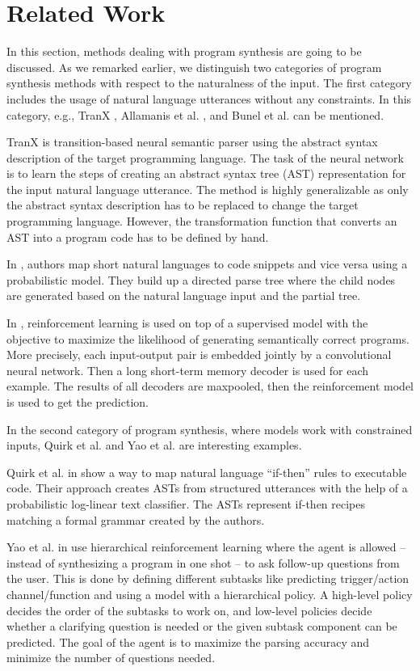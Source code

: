 \section{Related Work}

In this section, methods dealing with program synthesis are going to be
discussed. As we remarked earlier, we distinguish two categories of program
synthesis methods with respect to the naturalness of the input. The first
category includes the usage of natural language utterances without any constraints. In
this category, e.g., TranX \cite{tranx}, Allamanis et al. \cite{project3}, and
Bunel et al. \cite{project4} can be mentioned.

TranX is transition-based neural semantic parser using the abstract syntax
description of the target programming language. The task of the neural network
is to learn the steps of creating an abstract syntax tree (AST) representation
for the input natural language utterance. The method is highly generalizable as
only the abstract syntax description has to be replaced to change the target
programming language. However, the transformation function that converts an AST
into a program code has to be defined by hand.

In \cite{project3}, authors map short natural languages to code snippets and
vice versa using a probabilistic model. They build up a directed parse tree
where the child nodes are generated based on the natural language input and the
partial tree.

In \cite{project4}, reinforcement learning is used on top of a supervised model
with the objective to maximize the likelihood of generating semantically correct
programs. More precisely, each input-output pair is embedded jointly by a
convolutional neural network. Then a long short-term memory decoder is used for
each example. The results of all decoders are maxpooled, then the reinforcement
model is used to get the prediction.

In the second category of program synthesis, where models work with constrained
inputs, Quirk et al. \cite{project1} and Yao et al. \cite{project11} are
interesting examples.

Quirk et al. in \cite{project1} show a way to map natural language “if-then” rules
to executable code. Their approach creates ASTs from structured utterances
with the help of a probabilistic log-linear text classifier. The ASTs represent
if-then recipes matching a formal grammar created by the authors.

Yao et al. in \cite{project11} use hierarchical reinforcement learning where the
agent is allowed – instead of synthesizing a program in one shot – to ask
follow-up questions from the user. This is done by defining different subtasks
like predicting trigger/action channel/function and using a model with a
hierarchical policy. A high-level policy decides the order of the subtasks to
work on, and low-level policies decide whether a clarifying question is needed
or the given subtask component can be predicted. The goal of the agent is to
maximize the parsing accuracy and minimize the number of questions needed.

